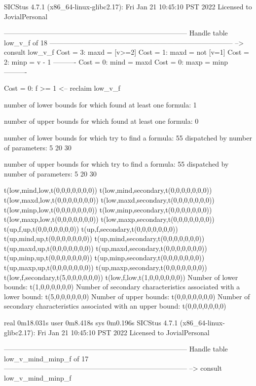 SICStus 4.7.1 (x86_64-linux-glibc2.17): Fri Jan 21 10:45:10 PST 2022
Licensed to JovialPersonal


--------------------------------------------------------------------------------
Handle table low_v_f of 18
--------------------------------------------------------------------------------
--> consult low_v_f
Cost =  3:  maxd = [v>=2]
Cost =  1:  maxd = not [v=1]
Cost =  2:  minp = v - 1
----------
Cost =  0:  mind = maxd
Cost =  0:  maxp = minp
----------

Cost =  0:  f >= 1
<-- reclaim low_v_f

number of lower bounds for which found at least one formula: 1

number of upper bounds for which found at least one formula: 0

number of lower bounds for which try to find a formula: 55
dispatched by number of parameters: 5  20  30

number of upper bounds for which try to find a formula: 55
dispatched by number of parameters: 5  20  30

t(low,mind,low,t(0,0,0,0,0,0,0))
t(low,mind,secondary,t(0,0,0,0,0,0,0))
t(low,maxd,low,t(0,0,0,0,0,0,0))
t(low,maxd,secondary,t(0,0,0,0,0,0,0))
t(low,minp,low,t(0,0,0,0,0,0,0))
t(low,minp,secondary,t(0,0,0,0,0,0,0))
t(low,maxp,low,t(0,0,0,0,0,0,0))
t(low,maxp,secondary,t(0,0,0,0,0,0,0))
t(up,f,up,t(0,0,0,0,0,0,0))
t(up,f,secondary,t(0,0,0,0,0,0,0))
t(up,mind,up,t(0,0,0,0,0,0,0))
t(up,mind,secondary,t(0,0,0,0,0,0,0))
t(up,maxd,up,t(0,0,0,0,0,0,0))
t(up,maxd,secondary,t(0,0,0,0,0,0,0))
t(up,minp,up,t(0,0,0,0,0,0,0))
t(up,minp,secondary,t(0,0,0,0,0,0,0))
t(up,maxp,up,t(0,0,0,0,0,0,0))
t(up,maxp,secondary,t(0,0,0,0,0,0,0))
t(low,f,secondary,t(5,0,0,0,0,0,0))
t(low,f,low,t(1,0,0,0,0,0,0))
Number of lower bounds:                                             t(1,0,0,0,0,0,0)
Number of secondary characteristics associated with a lower bound:  t(5,0,0,0,0,0,0)
Number of upper bounds:                                             t(0,0,0,0,0,0,0)
Number of secondary characteristics associated with an upper bound: t(0,0,0,0,0,0,0)

real	0m18.031s
user	0m8.418s
sys	0m0.196s
SICStus 4.7.1 (x86_64-linux-glibc2.17): Fri Jan 21 10:45:10 PST 2022
Licensed to JovialPersonal


--------------------------------------------------------------------------------
Handle table low_v_mind_minp_f of 17
--------------------------------------------------------------------------------
--> consult low_v_mind_minp_f

